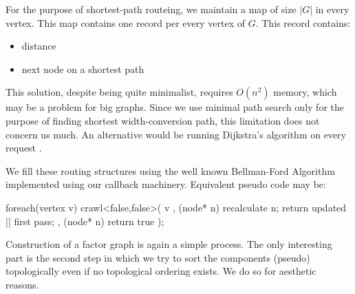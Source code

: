 For the purpose of shortest-path routeing, we maintain a map of size $| G |$ in every vertex. This map contains one record per every vertex of $G$. This record contains:

\begin{itemize}
  \item distance
  \item next node on a shortest path
\end{itemize}

This solution, despite being quite minimalist, requires $O(n^2)$ memory, which may be a problem for big graphs. Since we use minimal path search only for the purpose of finding shortest width-conversion path, this limitation does not concern us much. An alternative would be running Dijkstra's algorithm on every request \cite{chapters}.

We fill these routing structures using the well known Bellman-Ford Algorithm \cite{chapters} implemented using our callback machinery. Equivalent pseudo code may be:
\mybeginfig %
\begin{code}
foreach(vertex v)
{
  crawl<false,false>( v
    , (node* n){ recalculate n; return updated || first pass;}
    , (node* n){ return true }
  ); 
}
\end{code}

Construction of a factor graph is again a simple process. The only interesting part is the second step in which we try to sort the components (pseudo) topologically even if no topological ordering exists. We do so for aesthetic reasons.


